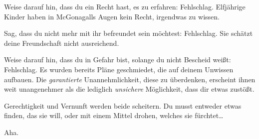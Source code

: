 \begin{em}
Weise darauf hin, dass du ein Recht hast, es zu erfahren: Fehlschlag. Elfjährige Kinder haben in McGonagalls Augen kein Recht, irgendwas zu wissen.

Sag, dass du nicht mehr mit ihr befreundet sein möchtest: Fehlschlag. Sie schätzt deine Freundschaft nicht ausreichend.

Weise darauf hin, dass du in Gefahr bist, solange du nicht Bescheid weißt: Fehlschlag. Es wurden bereits Pläne geschmiedet, die auf deinem Unwissen aufbauen. Die \emph{garantierte} Unannehmlichkeit, diese zu überdenken, erscheint ihnen weit unangenehmer als die lediglich \emph{unsichere} Möglichkeit, dass dir etwas zustößt.

Gerechtigkeit und Vernunft werden beide scheitern. Du musst entweder etwas finden, das sie will, oder mit einem Mittel drohen, welches sie fürchtet…
\end{em}

Aha.

